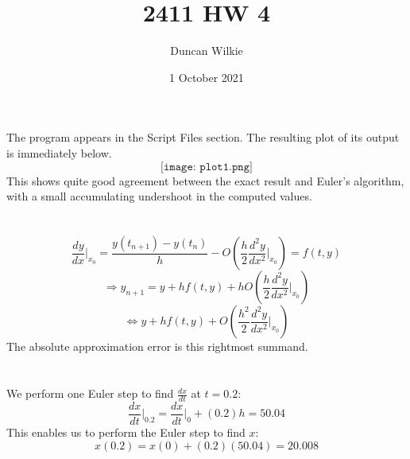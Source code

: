 \documentclass{article}
\title{2411 HW 4}
\author{Duncan Wilkie}
\date{1 October 2021}
\begin{document}
\maketitle

\section{}
The program appears in the Script Files section. The resulting plot of its output is immediately below.
\[\texttt{[image: plot1.png]}\]
This shows quite good agreement between the exact result and Euler's algorithm, with a small accumulating undershoot in the computed values.

\section{}
\[\frac{dy}{dx}\bigg|_{x_0} = \frac{y(t_{n+1})-y(t_n)}{h}-O\left(\frac{h}{2}\frac{d^2y}{dx^2}\bigg|_{x_0}\right)=f(t,y)\]
\[\Rightarrow y_{n+1}=y+hf(t,y) + hO\left(\frac{h}{2}\frac{d^2y}{dx^2}\bigg|_{x_0}\right)\]
\[\Leftrightarrow y+hf(t,y) + O\left(\frac{h^2}{2}\frac{d^2y}{dx^2}\bigg|_{x_0}\right)\]
The absolute approximation error is this rightmost summand.

\section{}
We perform one Euler step to find $\frac{dx}{dt}$ at $t=0.2$:
\[\frac{dx}{dt}\bigg|_{0.2}=\frac{dx}{dt}\bigg|_{0}+(0.2)h=50.04\]
This enables us to perform the Euler step to find $x$:
\[x(0.2)=x(0)+(0.2)(50.04)=20.008\]
\end{document}
